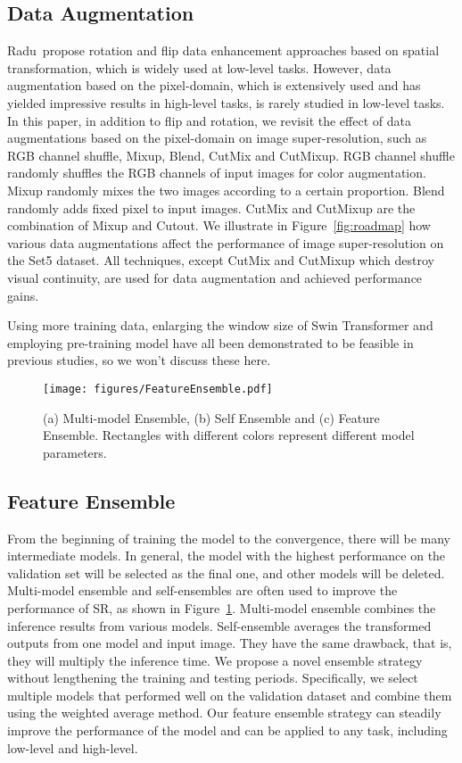 \documentclass[10pt,twocolumn,letterpaper]{article}
\begin{document}
\subsection{Data Augmentation}
Radu~\etal propose rotation and flip data enhancement approaches based on spatial transformation, which is widely used at low-level tasks. However, data augmentation based on the pixel-domain, which is extensively used and has yielded impressive results in high-level tasks, is rarely studied in low-level tasks. In this paper, in addition to flip and rotation, we revisit the effect of data augmentations based on the pixel-domain on image super-resolution, such as RGB channel shuffle, Mixup, Blend, CutMix and CutMixup. RGB channel shuffle randomly shuffles the RGB channels of input images for color augmentation. Mixup randomly mixes the two images according to a certain proportion. Blend randomly adds fixed pixel to input images. CutMix and CutMixup are the combination of Mixup and Cutout. We illustrate in Figure~\ref{fig:roadmap} how various data augmentations affect the performance of image super-resolution on the Set5 dataset. All techniques, except CutMix and CutMixup which destroy visual continuity, are used for data augmentation and achieved performance gains.

Using more training data, enlarging the window size of Swin Transformer and employing pre-training model have all been demonstrated to be feasible in previous studies, so we won't discuss these here.


\begin{figure}[t]
	\centering
	\texttt{[image: figures/FeatureEnsemble.pdf]}
	\vspace{-6mm}
	\caption{(a) Multi-model Ensemble, (b) Self Ensemble and (c) Feature Ensemble. Rectangles with different colors represent different model parameters.} 
	\label{fig:FeatureEnsemble}
	\vspace{-5mm}
\end{figure}


\subsection{Feature Ensemble}
From the beginning of training the model to the convergence, there will be many intermediate models. In general, the model with the highest performance on the validation set will be selected as the final one, and other models will be deleted. Multi-model ensemble and self-ensembles are often used to improve the performance of SR, as shown in Figure~\ref{fig:FeatureEnsemble}. Multi-model ensemble combines the inference results from various models. Self-ensemble averages the transformed outputs from one model and input image. They have the same drawback, that is, they will multiply the inference time. We propose a novel ensemble strategy without lengthening the training and testing periods. Specifically, we select multiple models that performed well on the validation dataset and combine them using the weighted average method. Our feature ensemble strategy can steadily improve the performance of the model and can be applied to any task, including low-level and high-level.
\end{document}
